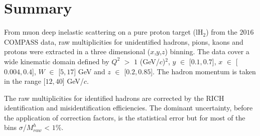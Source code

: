 \section{Summary}

From muon deep inelastic scattering on a pure proton target (lH$_2$) from the $2016$ COMPASS data, raw multiplicities for unidentified hadrons, pions, kaons and protons were extracted in a three dimensional ($x$,$y$,$z$) binning. The data cover a wide kinematic domain defined by $Q^2$ $>$ $1$ (GeV/$c$)$^2$, $y$ $\in$ [$0.1,0.7$], $x$ $\in$ [$0.004,0.4$], $W$ $\in$ [$5,17$] GeV and $z$ $\in$ [$0.2,0.85$]. The hadron momentum is taken in the range [$12,40$] GeV/$c$.

The raw multiplicities for identified hadrons are corrected by the RICH identification and misidentification efficiencies. The dominant uncertainty, before the application of correction factors, is the statistical error but for most of the bins $\sigma$/$M^h_{raw}$ < $1$\%.
